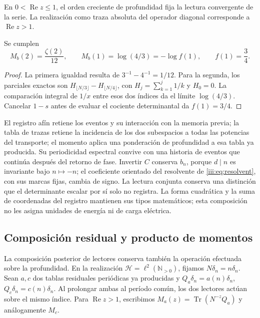 En $0<\operatorname{Re}z\leq1$, el orden creciente de profundidad
fija la lectura convergente de la serie. La realización como traza
absoluta del operador diagonal corresponde a $\operatorname{Re}z>1$.

\begin{corollary}
\label{amp-afin-cor-extremos}
Se cumplen
\begin{equation}
 M_b(2)=\frac{\zeta(2)}{12},\qquad
 M_b(1)=\log(4/3)=-\log f(1),\qquad f(1)=\frac34.
 \label{amp-afin-extremos}
\end{equation}
\end{corollary}
\begin{proof}
La primera igualdad resulta de $3^{-1}-4^{-1}=1/12$.
Para la segunda, los parciales exactos son
$H_{\lfloor N/3\rfloor}-H_{\lfloor N/4\rfloor}$, con
$H_j=\sum_{k=1}^j1/k$ y $H_0=0$.
La comparación integral de $1/x$ entre esos dos índices da el límite
$\log(4/3)$. Cancelar $1-s$ antes de evaluar el cociente determinantal
da $f(1)=3/4$.
\end{proof}

El registro afín retiene los eventos y su interacción con la memoria
previa; la tabla de trazas retiene la incidencia de los dos subespacios
a todas las potencias del transporte; el momento aplica una ponderación
de profundidad a esa tabla ya producida. Su periodicidad espectral
convive con una historia de eventos que continúa después del retorno
de fase. Invertir $C$ conserva $b_n$, porque $d\mid n$ es invariante
bajo $n\mapsto-n$; el coeficiente orientado del resolvente de
\eqref{iii:eq:resolvent}, con sus marcas fijas, cambia de signo.
La lectura conjunta conserva una distinción que el determinante
escalar por sí solo no registra. La forma cuadrática y la suma de
coordenadas del registro mantienen sus tipos matemáticos; esta
composición no les asigna unidades de energía ni de carga eléctrica.

\subsection{Composición residual y producto de momentos}
\label{amp-afin-sec-productos}

La composición posterior de lectores conserva también la operación
efectuada sobre la profundidad. En la realización
$\mathcal H=\ell^2(\mathbb N_{>0})$, fijamos
$N\delta_n=n\delta_n$. Sean $a,c$ dos tablas residuales periódicas
ya producidas y $Q_a\delta_n=a(n)\delta_n$,
$Q_c\delta_n=c(n)\delta_n$. Al prolongar ambas al período común,
los dos lectores actúan sobre el mismo índice. Para
$\operatorname{Re}z>1$, escribimos
$M_a(z)=\operatorname{Tr}(N^{-z}Q_a)$ y análogamente $M_c$.

